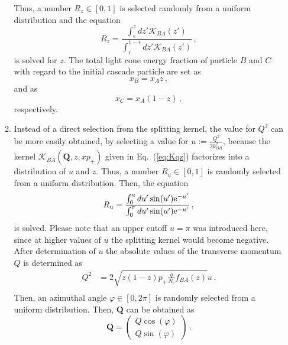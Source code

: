 \documentclass[preprint,12pt]{elsarticle}
\begin{document}
\begin{enumerate}
\begin{enumerate}
        Thus, a number $R_z\in[0,1]$ is selected randomly from a uniform distribution and the equation
        \begin{equation}
            R_z=\frac{\int_\epsilon^z dz'\mathcal{K}_{BA}(z')}{\int_\epsilon^{1-\epsilon} dz'\mathcal{K}_{BA}(z')}\,,
            \label{eq:zsel}
        \end{equation}
        is solved for $z$. The total light cone energy fraction of particle $B$ and $C$ with regard to the initial cascade particle are set as 
        \begin{equation}
            x_B=x_Az\,,
        \end{equation}
        and as
        \begin{equation}
            x_C=x_A(1-z)\,,
        \end{equation}     
        respectively.
        \item Instead of a direct selection from the splitting kernel, the value for $Q^2$ can be more easily obtained, by selecting a value for $u:=\frac{Q^2}{2k_{BR}^2}$, because the kernel $\mathcal{K}_{BA}(\mathbf{Q},z,xp_+)$ given in Eq.~(\ref{eq:Kqz}) factorizes into a distribution of $u$ and $z$. 
        Thus, a number $R_u\in [0,1]$ is randomly selected from a uniform distribution.
        Then, the equation 
        \begin{equation}
            R_u=\frac{\int_0^u du' \sin (u') {\rm e}^{-u'}}{\int_0^\pi du' \sin (u') {\rm e}^{-u'}}\,,
            \label{eq:usel}
        \end{equation}
        is solved.
        Please note that an upper cutoff $u=\pi$ was introduced here, since at higher values of $u$ the splitting kernel would become negative.
        After determination of $u$ the absolute values of the transverse momentum $Q$ is determined as 
        \begin{align}
            Q^2&= 2\sqrt{z(1-z)p_+\frac{\hat{q}}{N_c}f_{BA}(z)}u\,.\\
        \end{align}
        Then, an azimuthal angle $\varphi\in [0,2\pi]$ is randomly selected from a uniform distribution. Then, $\mathbf{Q}$ can be obtained as
        \begin{equation}
            \mathbf{Q}=\left(\begin{array}{c}
                Q\cos (\varphi) \\
                Q\sin (\varphi)   
            \end{array}
            \right)\,.

\end{equation}
\end{enumerate}
\end{enumerate}
\end{document}
